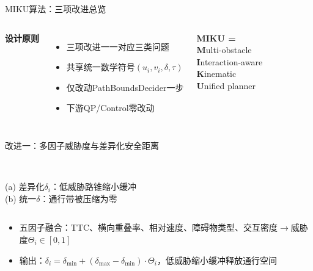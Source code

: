 \documentclass[aspectratio=169,10pt,fontset=none]{ctexbeamer}
\begin{document}
\begin{frame}{MIKU算法：三项改进总览}
\begin{columns}[T,onlytextwidth]
  \centering
  \small
  \textbf{设计原则}
  \begin{itemize}\setlength\itemsep{3pt}
    \item 三项改进一一对应三类问题
    \item 共享统一数学符号$(u_i, v_i, \delta, \tau)$
    \item 仅改动PathBoundsDecider一步
    \item 下游QP/Control零改动
  \end{itemize}
  \vspace{0.4em}
  \textbf{MIKU = }\\
  \textbf{M}ulti-obstacle\\
  \textbf{I}nteraction-aware\\
  \textbf{K}inematic\\
  \textbf{U}nified planner
\end{columns}
\end{frame}

\begin{frame}{改进一：多因子威胁度与差异化安全距离}
\begin{columns}[T,onlytextwidth]
  \centering
  \\[2pt]
  {\footnotesize (a) 差异化$\delta_i$：低威胁路锥缩小缓冲}
  \centering
  \\[2pt]
  {\footnotesize (b) 统一$\delta$：通行带被压缩为零}
\end{columns}
\vspace{0.3em}
\small
\begin{itemize}\setlength\itemsep{2pt}
  \item 五因子融合：TTC、横向重叠率、相对速度、障碍物类型、交互密度$\to$威胁度$\Theta_i\in[0,1]$
  \item 输出：$\delta_i = \delta_{\min} + (\delta_{\max}-\delta_{\min})\cdot\Theta_i$，低威胁缩小缓冲释放通行空间
\end{itemize}
\end{frame}
\end{document}
